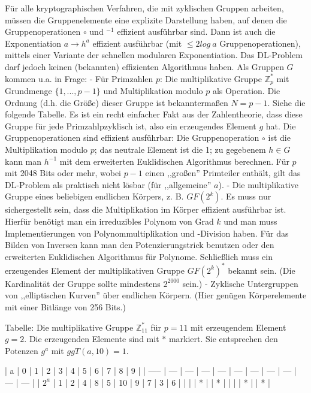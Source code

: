 \documentclass[a4paper]{article}
\begin{document}
\begin{multicols}{3}
{{{{        Für alle kryptographischen Verfahren, die mit zyklischen Gruppen arbeiten, müssen die Gruppenelemente eine explizite Darstellung haben, auf denen die Gruppenoperationen $\circ$ und $^{-1}$ effizient ausführbar sind.
        Dann ist auch die Exponentiation $a\rightarrow h^a$ effizient ausführbar (mit $\leq 2 log\ a$ Gruppenoperationen), mittels einer Variante der schnellen modularen Exponentiation. Das DL-Problem darf jedoch keinen (bekannten) effizienten Algorithmus haben.
        Als Gruppen $G$ kommen u.a. in Frage:
        - Für Primzahlen $p$: Die multiplikative Gruppe $\mathbb{Z}^*_p$ mit Grundmenge $\{1,...,p-1\}$ und Multiplikation modulo $p$ als Operation. Die Ordnung (d.h. die Größe) dieser Gruppe ist bekanntermaßen $N=p-1$. Siehe die folgende Tabelle. Es ist ein recht einfacher Fakt aus der Zahlentheorie, dass diese Gruppe für jede Primzahlpzyklisch ist, also ein erzeugendes Element $g$ hat. Die Gruppenoperationen sind effizient ausführbar: Die Gruppenoperation $\circ$ ist die Multiplikation modulo $p$; das neutrale Element ist die 1; zu gegebenem $h\in G$ kann man $h^{-1}$ mit dem erweiterten Euklidischen Algorithmus berechnen. Für $p$ mit 2048 Bits oder mehr, wobei $p-1$ einen ,,großen'' Primteiler enthält, gilt das DL-Problem als praktisch nicht lösbar (für ,,allgemeine'' $a$).
        - Die multiplikative Gruppe eines beliebigen endlichen Körpers, z. B. $GF(2^k)$. Es muss nur sichergestellt sein, dass die Multiplikation im Körper effizient ausführbar ist. Hierfür benötigt man ein irreduzibles Polynom von Grad $k$ und man muss Implementierungen von Polynommultiplikation und -Division haben. Für das Bilden von Inversen kann man den Potenzierungstrick benutzen oder den erweiterten Euklidischen Algorithmus für Polynome. Schließlich muss ein erzeugendes Element der multiplikativen Gruppe $GF(2^k)^*$ bekannt sein. (Die Kardinalität der Gruppe sollte mindestens $2^{2000}$ sein.)
        - Zyklische Untergruppen von ,,elliptischen Kurven'' über endlichen Körpern. (Hier genügen Körperelemente mit einer Bitlänge von 256 Bits.)

        Tabelle: Die multiplikative Gruppe $\mathbb{Z}^*_{11}$ für $p=11$ mit erzeugendem Element $g=2$. Die erzeugenden Elemente sind mit $*$ markiert. Sie entsprechen den Potenzen $g^a$ mit $ggT(a,10) = 1$.

        | a     | 0   | 1   | 2   | 3   | 4   | 5   | 6   | 7   | 8   | 9   |
        | ----- | --- | --- | --- | --- | --- | --- | --- | --- | --- | --- |
        | $2^a$ | 1   | 2   | 4   | 8   | 5   | 10  | 9   | 7   | 3   | 6   |
        |       |     | *   |     | *   |     |     |     | *   |     | *   |

}}}}
\end{multicols}
\end{document}
